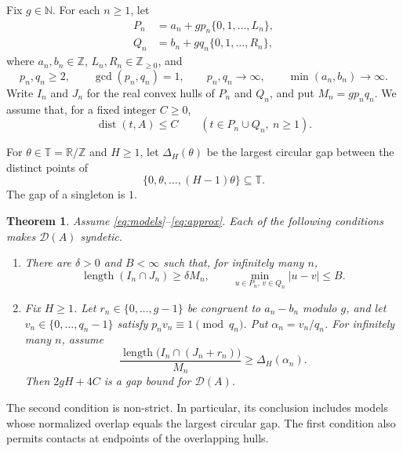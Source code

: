 \documentclass[11pt,leqno]{amsart}
\numberwithin{equation}{section}
\newtheorem{theorem}{Theorem}[section]
\theoremstyle{definition}
\theoremstyle{remark}
\newcommand{\N}{\mathbb N}
\newcommand{\Z}{\mathbb Z}
\newcommand{\R}{\mathbb R}
\newcommand{\T}{\mathbb T}
\newcommand{\dist}{\operatorname{dist}}
\newcommand{\len}{\operatorname{length}}
\newcommand{\D}{\mathcal D}
\newcommand{\gap}{\Delta}
\begin{document}
Fix $g\in\N$. For each $n\ge1$, let
\begin{equation}\label{eq:models}
\begin{split}
P_n&=a_n+gp_n\{0,1,\ldots,L_n\},\\
Q_n&=b_n+gq_n\{0,1,\ldots,R_n\},
\end{split}
\end{equation}
where $a_n,b_n\in\Z$, $L_n,R_n\in\Z_{\ge0}$, and
\begin{equation}\label{eq:standing}
p_n,q_n\ge2,\qquad \gcd(p_n,q_n)=1,\qquad
p_n,q_n\longrightarrow\infty,\qquad
\min(a_n,b_n)\longrightarrow\infty.
\end{equation}
Write $I_n$ and $J_n$ for the real convex hulls of $P_n$ and $Q_n$, and put $M_n=gp_nq_n$. We assume that, for a fixed integer $C\ge0$,
\begin{equation}\label{eq:approx}
\dist(t,A)\le C\qquad(t\in P_n\cup Q_n,\ n\ge1).
\end{equation}

For $\theta\in\T=\R/\Z$ and $H\ge1$, let $\gap_H(\theta)$ be the largest circular gap between the distinct points of
\begin{equation}\label{eq:circlepoints}
\{0,\theta,\ldots,(H-1)\theta\}\subseteq\T.
\end{equation}
The gap of a singleton is $1$.

\begin{theorem}\label{thm:main}
Assume \eqref{eq:models}--\eqref{eq:approx}. Each of the following conditions makes $\D(A)$ syndetic.
\begin{enumerate}
\item There are $\delta>0$ and $B<\infty$ such that, for infinitely many $n$,
\begin{equation}\label{eq:contact}
\len(I_n\cap J_n)\ge\delta M_n,
\qquad \min_{u\in P_n,\,v\in Q_n}|u-v|\le B.
\end{equation}
\item Fix $H\ge1$. Let $r_n\in\{0,\ldots,g-1\}$ be congruent to $a_n-b_n$ modulo $g$, and let $v_n\in\{0,\ldots,q_n-1\}$ satisfy $p_nv_n\equiv1\pmod{q_n}$. Put $\alpha_n=v_n/q_n$. For infinitely many $n$, assume
\begin{equation}\label{eq:finite-test}
\frac{\len\bigl(I_n\cap(J_n+r_n)\bigr)}{M_n}
\ge\gap_H(\alpha_n).
\end{equation}
Then $2gH+4C$ is a gap bound for $\D(A)$.
\end{enumerate}
\end{theorem}

The second condition is non-strict. In particular, its conclusion includes models whose normalized overlap equals the largest circular gap. The first condition also permits contacts at endpoints of the overlapping hulls.
\end{document}
